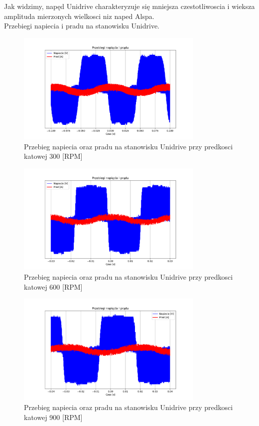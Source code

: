 \documentclass[11pt]{article}
\begin{document}
Jak widzimy, napęd Unidrive charakteryzuje się mniejsza czestotliwoscia i wieksza amplituda mierzonych wielkosci niz naped Alspa.\\

Przebiegi napiecia i pradu na stanowisku Unidrive.\\

\begin{figure}[H]
\centering
\includegraphics[width=0.8\textwidth]{aun1_unidrive_rpm300.pdf}
\caption{Przebieg napiecia oraz pradu na stanowisku Unidrive przy predkosci katowej 300 [RPM]}
\end{figure}

\begin{figure}[H]
\centering
\includegraphics[width=0.8\textwidth]{aun1_unidrive_rpm600.pdf}
\caption{Przebieg napiecia oraz pradu na stanowisku Unidrive przy predkosci katowej 600 [RPM]}
\end{figure}

\begin{figure}[H]
\centering
\includegraphics[width=0.8\textwidth]{aun1_unidrive_rpm900.pdf}
\caption{Przebieg napiecia oraz pradu na stanowisku Unidrive przy predkosci katowej 900 [RPM]}
\end{figure}
\end{document}
